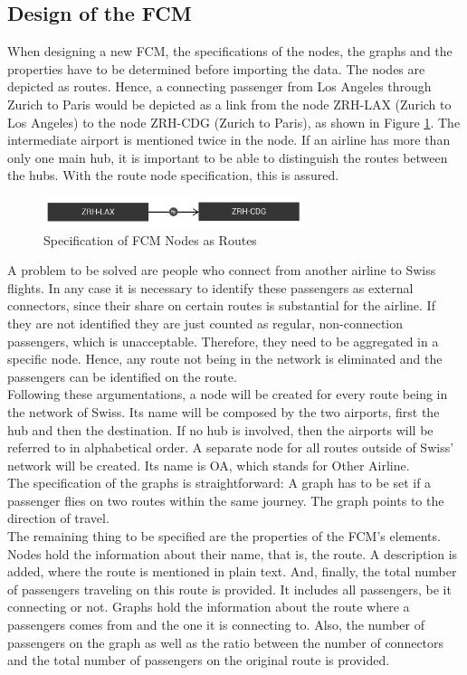 \documentclass[conference]{IEEEtran}
\begin{document}
\subsection{Design of the FCM}
When designing a new FCM, the specifications of the nodes, the graphs and the properties have to be determined before importing the data. The nodes are depicted as routes. Hence, a connecting passenger from Los Angeles through Zurich to Paris would be depicted as a link from the node ZRH-LAX (Zurich to Los Angeles) to the node ZRH-CDG (Zurich to Paris), as shown in Figure \ref{fig:noderoute}. The intermediate airport is mentioned twice in the node. If an airline has more than only one main hub, it is important to be able to distinguish the routes between the hubs. With the route node specification, this is assured.
\begin{figure}[h]
\includegraphics[width=3in]{img/route.png}
\caption{Specification of FCM Nodes as Routes}
\label{fig:noderoute}
\end{figure}
A problem to be solved are people who connect from another airline to Swiss flights. In any case it is necessary to identify these passengers as external connectors, since their share on certain routes is substantial for the airline. If they are not identified they are just counted as regular, non-connection passengers, which is unacceptable. Therefore, they need to be aggregated in a specific node. Hence, any route not being in the network is eliminated and the passengers can be identified on the route.\\
Following these argumentations, a node will be created for every route being in the network of Swiss. Its name will be composed by the two airports, first the hub and then the destination. If no hub is involved, then the airports will be referred to in alphabetical order. A separate node for all routes outside of Swiss' network will be created. Its name is OA, which stands for Other Airline.\\
The specification of the graphs is straightforward: A graph has to be set if a passenger flies on two routes within the same journey. The graph points to the direction of travel.\\
The remaining thing to be specified are the properties of the FCM's elements. Nodes hold the information about their name, that is, the route. A description is added, where the route is mentioned in plain text. And, finally, the total number of passengers traveling on this route is provided. It includes all passengers, be it connecting or not. Graphs hold the information about the route where a passengers comes from and the one it is connecting to. Also, the number of passengers on the graph as well as the ratio between the number of connectors and the total number of passengers on the original route is provided.\\
\end{document}
